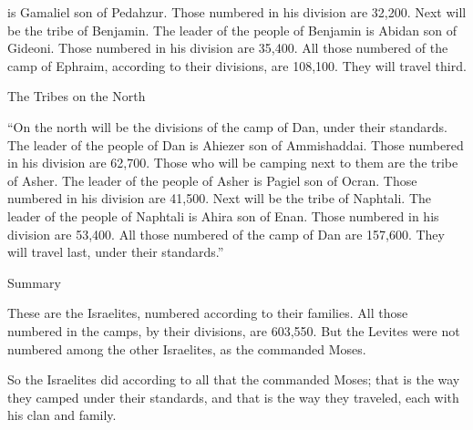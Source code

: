 {is Gamaliel
son
of Pedahzur.
Those numbered
in his division
are 32,200.
Next will be the tribe
of Benjamin.
The leader
of the people of Benjamin
is Abidan
son
of Gideoni.
Those numbered
in his division
are 35,400.
All
those numbered
of the camp
of Ephraim,
according to their divisions,
are 108,100.
They will travel
third.
\par }{\SH The Tribes on the North
\par }{\PP {}“On the north
will be the divisions
of the camp
of Dan,
under their standards.
The leader
of the people of Dan
is Ahiezer
son
of Ammishaddai.
Those numbered
in his division
are 62,700.
Those
who will be camping
next to them are the tribe
of Asher.
The leader
of the people of Asher
is Pagiel
son
of Ocran.
Those numbered
in his division
are 41,500.
Next will be the tribe
of Naphtali.
The leader
of the people of Naphtali
is Ahira
son
of Enan.
Those numbered
in his division
are 53,400.
All
those numbered
of the camp
of Dan
are 157,600.
They will travel
last,
under their standards.”
\par }{\SH Summary
\par }{\PP {}These
are the Israelites,
numbered
according to their families.
All
those numbered
in the camps,
by their divisions,
are 603,550.
But the Levites
were not
numbered
among
the other Israelites,
as
the
{}
commanded
Moses.
\par }{\PP {}So
the Israelites
did
according to all
that
the {}
commanded
Moses;
that is the way
they camped
under their standards,
and that is the way
they traveled,
each
with his clan
and family.


}
